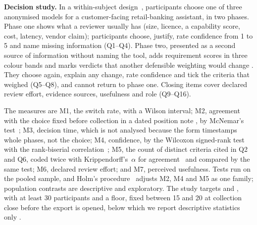 \textbf{Decision study.}
In a within-subject design~\cite{wohlin2012experimentation}, participants choose one of three anonymised models for a customer-facing retail-banking assistant, in two phases.
Phase one shows what a reviewer usually has (size, licence, a capability score, cost, latency, vendor claim); participants choose, justify, rate confidence from 1 to 5 and name missing information (Q1--Q4).
Phase two, presented as a second source of information without naming the tool, adds requirement scores in three colour bands and marks verdicts that another defensible weighting would change .
They choose again, explain any change, rate confidence and tick the criteria that weighed (Q5--Q8), and cannot return to phase one.
Closing items cover declared review effort, evidence sources, usefulness and role (Q9--Q16).

The measures are M1, the switch rate, with a Wilson interval; M2, agreement with the choice fixed before collection in a dated position note , by McNemar's test~\cite{mcnemar1947}; M3, decision time, which is not analysed because the form timestamps whole phases, not the choice; M4, confidence, by the Wilcoxon signed-rank test~\cite{wilcoxon1945} with the rank-biserial correlation~\cite{kerby2014}; M5, the count of distinct criteria cited in Q2 and Q6, coded twice  with Krippendorff's~$\alpha$ for agreement~\cite{hayes2007answering} and compared by the same test; M6, declared review effort; and M7, perceived usefulness.
Tests run on the pooled sample, and Holm's procedure~\cite{holm1979} adjusts M2, M4 and M5 as one family; population contrasts are descriptive and exploratory.
The study targets \aicc{} and \legalrisk{} , with at least 30 participants and a floor, fixed between 15 and 20 at collection close before the export is opened, below which we report descriptive statistics only .

